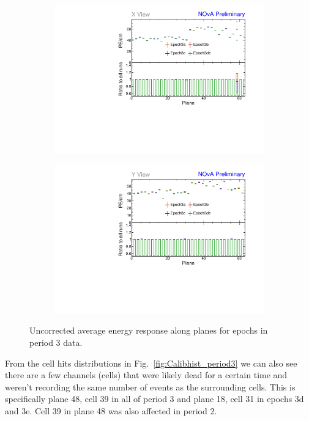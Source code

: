 \begin{figure}[hbtp]
\centering
\begin{subfigure}[b]{0.495\textwidth}
\centering
\includegraphics[width=\textwidth]{Plots/TBCalibration/Attenprofs_P3Data_PlanePE_X_Combined.pdf}
\end{subfigure}
\begin{subfigure}[b]{0.495\textwidth}
\centering
\includegraphics[width=\textwidth]{Plots/TBCalibration/Attenprofs_P3Data_PlanePE_Y_Combined.pdf}
\end{subfigure}
\caption{Uncorrected average energy response along planes for epochs in period 3 data.}
\label{fig:CalibhistPlanePE_period3}
\end{figure}

From the cell hits distributions in Fig.~\ref{fig:Calibhist_period3} we can also see there are a few channels (cells) that were likely dead for a certain time and weren't recording the same number of events as the surrounding cells. This is specifically plane 48, cell 39 in all of period 3 and plane 18, cell 31 in epochs 3d and 3e. Cell 39 in plane 48 was also affected in period 2.

